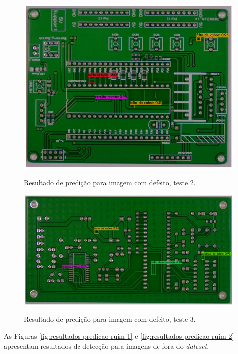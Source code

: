 \begin{figure}[H] %
  \centering
  \caption{Resultado de predição para imagem com defeito, teste 2.}
  \includegraphics[scale=0.5]{img/img-resultados-predicao-2.jpg}
  \label{fig:resultados-predicao-2}
\end{figure}

\begin{figure}[!h] %
  \centering
  \caption{Resultado de predição para imagem com defeito, teste 3.}
  \includegraphics[scale=0.45]{img/img-resultados-predicao-3.jpg}
  \label{fig:resultados-predicao-3}
\end{figure}

As Figuras \ref{fig:resultados-predicao-ruim-1} e \ref{fig:resultados-predicao-ruim-2} apresentam resultados de detecção para imagens de fora do \textit{dataset}.

